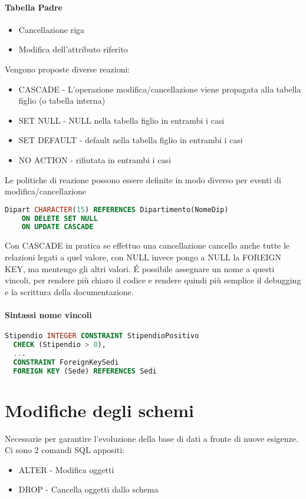 \paragraph*{Tabella Padre}
\begin{itemize}
  \item Cancellazione riga
  \item Modifica dell'attributo riferito
\end{itemize}
Vengono proposte diverse reazioni:
\begin{itemize}
  \item CASCADE - L'operazione modifica/cancellazione viene propagata alla tabella figlio (o tabella interna)
  \item SET NULL - NULL nella tabella figlio in entrambi i casi
  \item SET DEFAULT - default nella tabella figlio in entrambi i casi
  \item NO ACTION - rifiutata in entrambi i casi
\end{itemize}
Le politiche di reazione possono essere definite in modo diverso per eventi di modifica/cancellazione
\begin{lstlisting}[language=SQL]
  Dipart CHARACTER(15) REFERENCES Dipartimento(NomeDip)
    ON DELETE SET NULL
    ON UPDATE CASCADE
\end{lstlisting}
Con CASCADE in pratica se effettuo una cancellazione cancello anche tutte le relazioni legati a quel valore,
con NULL invece pongo a NULL la FOREIGN KEY, ma mentengo gli altri valori.
\'E possibile assegnare un nome a questi vincoli, per rendere più chiaro il codice e rendere
quindi più semplice il debugging e la scrittura della documentazione.
\paragraph*{Sintassi nome vincoli}
\begin{lstlisting}[language=SQL]
  Stipendio INTEGER CONSTRAINT StipendioPositivo
  CHECK (Stipendio > 0),
  ...
  CONSTRAINT ForeignKeySedi
  FOREIGN KEY (Sede) REFERENCES Sedi
\end{lstlisting}

\section{Modifiche degli schemi}
Necessarie per garantire l'evoluzione della base di dati a fronte di nuove esigenze.\\
Ci sono 2 comandi SQL appositi:
\begin{itemize}
  \item ALTER - Modifica oggetti
  \item DROP - Cancella oggetti dallo schema
\end{itemize}
